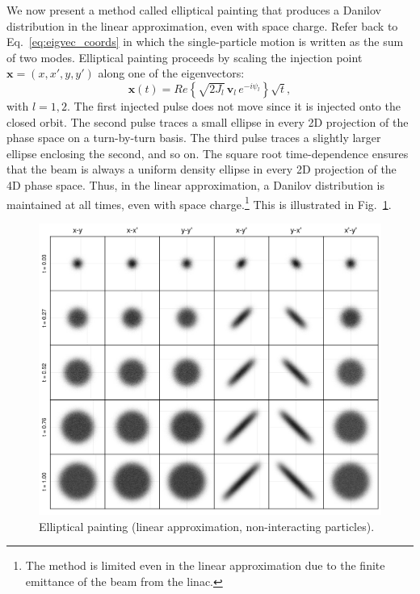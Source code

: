 We now present a method called elliptical painting that produces a Danilov distribution in the linear approximation, even with space charge. Refer back to Eq.~\eqref{eq:eigvec_coords} in which the single-particle motion is written as the sum of two modes. Elliptical painting proceeds by scaling the injection point $\mathbf{x} = (x, x', y, y')$ along one of the eigenvectors:
%
\begin{equation}\label{eq:elliptical_painting}
    \mathbf{x}(t) =  
    Re \left\{ \sqrt{2 J_l} \, \mathbf{v}_l \, e^{-i\psi_l} \right\} \sqrt{t},
\end{equation}
%
with $l = 1,2$. The first injected pulse does not move since it is injected onto the closed orbit. The second pulse traces a small ellipse in every 2D projection of the phase space on a turn-by-turn basis. The third pulse traces a slightly larger ellipse enclosing the second, and so on. The square root time-dependence ensures that the beam is always a uniform density ellipse in every 2D projection of the 4D phase space. Thus, in the linear approximation, a Danilov distribution is maintained at all times, even with space charge.\footnote{The method is limited even in the linear approximation due to the finite emittance of the beam from the linac.} This is illustrated in Fig.~\ref{fig:elliptical_painting}.
%
\begin{figure}[!p]
    \centering
    \includegraphics[width=\textwidth]{Images/chapter1/snapshots_ell.png}
    \caption{Elliptical painting (linear approximation, non-interacting particles).}
    \label{fig:elliptical_painting}
\end{figure}
%

